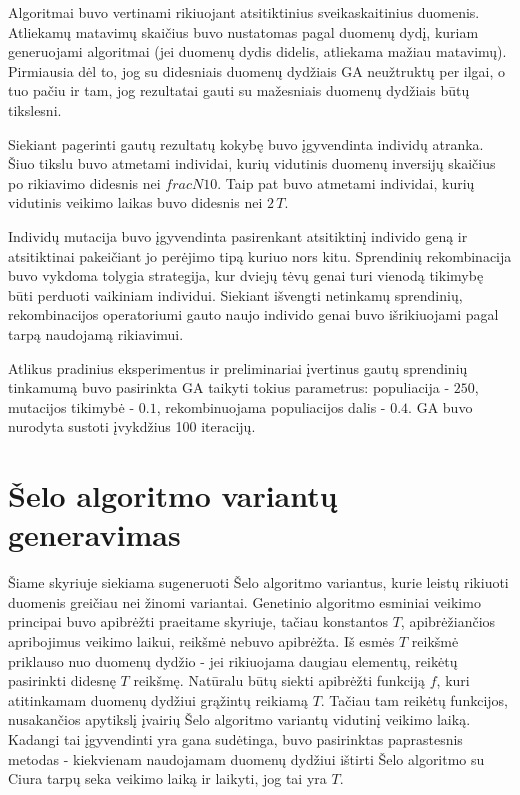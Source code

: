 \documentclass{VUMIFInfBakalaurinis}
\begin{document}
Algoritmai buvo vertinami rikiuojant atsitiktinius sveikaskaitinius duomenis.
Atliekamų matavimų skaičius buvo nustatomas pagal duomenų dydį, kuriam generuojami algoritmai (jei duomenų dydis didelis, atliekama mažiau matavimų).
Pirmiausia dėl to, jog su didesniais duomenų dydžiais GA neužtruktų per ilgai, o tuo pačiu ir tam,
jog rezultatai gauti su mažesniais duomenų dydžiais būtų tikslesni.

Siekiant pagerinti gautų rezultatų kokybę buvo įgyvendinta individų atranka.
Šiuo tikslu buvo atmetami individai, kurių vidutinis duomenų inversijų skaičius po rikiavimo didesnis nei $frac{N}{10}$.
Taip pat buvo atmetami individai, kurių vidutinis veikimo laikas buvo didesnis nei $2\,T$.

Individų mutacija buvo įgyvendinta pasirenkant atsitiktinį individo geną ir atsitiktinai pakeičiant jo perėjimo tipą kuriuo nors kitu.
Sprendinių rekombinacija buvo vykdoma tolygia strategija, kur dviejų tėvų genai turi vienodą tikimybę
būti perduoti vaikiniam individui.
Siekiant išvengti netinkamų sprendinių, rekombinacijos operatoriumi gauto naujo individo genai buvo išrikiuojami pagal tarpą naudojamą rikiavimui.

Atlikus pradinius eksperimentus ir preliminariai įvertinus gautų sprendinių tinkamumą buvo pasirinkta GA taikyti tokius parametrus:
populiacija - $250$, mutacijos tikimybė - $0.1$, rekombinuojama populiacijos dalis - $0.4$.
GA buvo nurodyta sustoti įvykdžius 100 iteracijų.

\section{Šelo algoritmo variantų generavimas}

Šiame skyriuje siekiama sugeneruoti Šelo algoritmo variantus,
kurie leistų rikiuoti duomenis greičiau nei žinomi variantai.
Genetinio algoritmo esminiai veikimo principai buvo apibrėžti praeitame skyriuje, tačiau
konstantos $T$, apibrėžiančios apribojimus veikimo laikui, reikšmė nebuvo apibrėžta.
Iš esmės $T$ reikšmė priklauso nuo duomenų dydžio - jei rikiuojama daugiau elementų, reikėtų pasirinkti didesnę $T$ reikšmę.
Natūralu būtų siekti apibrėžti funkciją $f$, kuri atitinkamam duomenų dydžiui grąžintų reikiamą $T$.
Tačiau tam reikėtų funkcijos, nusakančios apytikslį įvairių Šelo algoritmo variantų vidutinį veikimo laiką.
Kadangi tai įgyvendinti yra gana sudėtinga, buvo pasirinktas paprastesnis metodas - kiekvienam naudojamam duomenų dydžiui ištirti
Šelo algoritmo su Ciura tarpų seka veikimo laiką ir laikyti, jog tai yra $T$.
\end{document}
